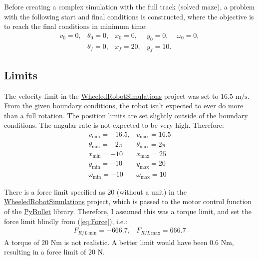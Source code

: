 \documentclass[12pt]{article}
\numberwithin{equation}{section} %
\numberwithin{figure}{section} %
\begin{document}
Before creating a complex simulation with the full track (solved maze), a problem with the following start and final conditions is constructed, where the objective is to reach the final conditions in minimum time:
\begin{equation}
	\begin{matrix}
		v_0 = 0, & \theta_0 = 0, & x_0 = 0, & y_0 = 0, & \omega_0 = 0, \\
		& \theta_f = 0, & x_f = 20, & y_f = 10. &
	\end{matrix} \nonumber
\end{equation}

\subsection{Limits}
\label{sec:Limits}

The velocity limit in the {\color{blue} \href{https://github.com/Yurof/WheeledRobotSimulations}{WheeledRobotSimulations}} project was set to $16.5$ $\mathrm{m/s}$. From the given boundary conditions, the robot isn't expected to ever do more than a full rotation. The position limits are set slightly outside of the boundary conditions. The angular rate is not expected to be very high. Therefore:
\begin{equation}
	\begin{matrix}
		v_\mathrm{min} = -16.5, & v_\mathrm{max} = 16.5 \\
		\theta_\mathrm{min} = - 2 \pi & \theta_\mathrm{max} = 2 \pi \\
		x_\mathrm{min} = - 10 & x_\mathrm{max} = 25 \\
		y_\mathrm{min} = - 10 & y_\mathrm{max} = 20 \\
		\omega_\mathrm{min} = - 10 & \omega_\mathrm{max} = 10
	\end{matrix} \nonumber
\end{equation}

There is a force limit specified as $20$ (without a unit) in the {\color{blue} \href{https://github.com/Yurof/WheeledRobotSimulations}{WheeledRobotSimulations}} project, which is passed to the motor control function of the {\color{blue} \href{https://github.com/bulletphysics/bullet3}{PyBullet}} library. Therefore, I assumed this was a torque limit, and set the force limit blindly from (\ref{eq:Force}), i.e.:
\begin{equation}
	\begin{matrix}
		F_{R/L \, \mathrm{min}} = -666.7, & F_{R/L \, \mathrm{max}} = 666.7
	\end{matrix} \nonumber
\end{equation}
A torque of $20$ $\mathrm{Nm}$ is not realistic. A better limit would have been $0.6$ $\mathrm{Nm}$, resulting in a force limit of $20$ N.
\end{document}
